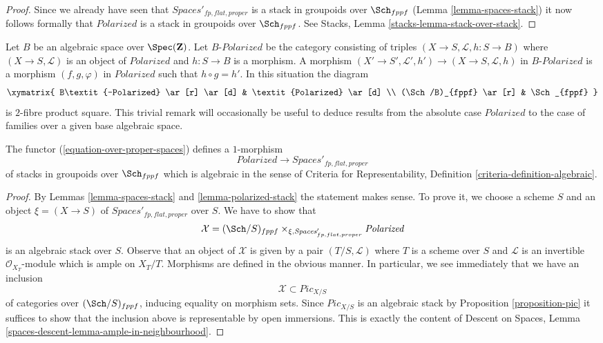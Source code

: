 \begin{proof}
\medskip\noindent
Since we already have seen that $\textit{Spaces}'_{fp, flat, proper}$
is a stack in groupoids over $\Sch_{fppf}$
(Lemma \ref{lemma-spaces-stack}) it now follows formally
that $\textit{Polarized}$ is a stack in groupoids over $\Sch_{fppf}$.
See Stacks, Lemma \ref{stacks-lemma-stack-over-stack}.
\end{proof}

\begin{remark}
\label{remark-polarized-base-change}
Let $B$ be an algebraic space over $\Spec(\mathbf{Z})$.
Let $B\textit{-Polarized}$ be the category consisting
of triples $(X \to S, \mathcal{L}, h : S \to B)$
where $(X \to S, \mathcal{L})$ is an object of
$\textit{Polarized}$ and $h : S \to B$ is a morphism.
A morphism $(X' \to S', \mathcal{L}', h') \to (X \to S, \mathcal{L}, h)$
in $B\textit{-Polarized}$ is a morphism $(f, g, \varphi)$
in $\textit{Polarized}$ such that $h \circ g = h'$.
In this situation the diagram
$$
\xymatrix{
B\textit{-Polarized} \ar[r] \ar[d] & \textit{Polarized} \ar[d] \\
(\Sch/B)_{fppf} \ar[r] & \Sch_{fppf}
}
$$
is $2$-fibre product square. This trivial remark
will occasionally be useful to deduce results from
the absolute case $\textit{Polarized}$ to the case
of families over a given base algebraic space.
\end{remark}

\begin{lemma}
\label{lemma-polarized-to-spaces-algebraic}
The functor (\ref{equation-over-proper-spaces}) defines a $1$-morphism
$$
\textit{Polarized} \to \textit{Spaces}'_{fp, flat, proper}
$$
of stacks in groupoids over $\Sch_{fppf}$
which is algebraic in the sense of
Criteria for Representability, Definition
\ref{criteria-definition-algebraic}.
\end{lemma}

\begin{proof}
By Lemmas \ref{lemma-spaces-stack} and \ref{lemma-polarized-stack}
the statement makes sense. To prove it, we choose a scheme $S$
and an object $\xi = (X \to S)$ of $\textit{Spaces}'_{fp, flat, proper}$
over $S$. We have to show that
$$
\mathcal{X} = (\Sch/S)_{fppf} \times_{\xi, \textit{Spaces}'_{fp, flat, proper}}
\textit{Polarized}
$$
is an algebraic stack over $S$. Observe that an object of $\mathcal{X}$
is given by a pair $(T/S, \mathcal{L})$ where $T$ is a scheme
over $S$ and $\mathcal{L}$ is an invertible $\mathcal{O}_{X_T}$-module
which is ample on $X_T/T$. Morphisms are defined in the obvious manner.
In particular, we see immediately that we have an inclusion
$$
\mathcal{X} \subset \textit{Pic}_{X/S}
$$
of categories over $(\Sch/S)_{fppf}$, inducing equality on morphism
sets. Since $\textit{Pic}_{X/S}$ is an algebraic stack by
Proposition \ref{proposition-pic} it suffices to show that the inclusion
above is representable by open immersions. This is exactly the content
of Descent on Spaces, Lemma
\ref{spaces-descent-lemma-ample-in-neighbourhood}.
\end{proof}

